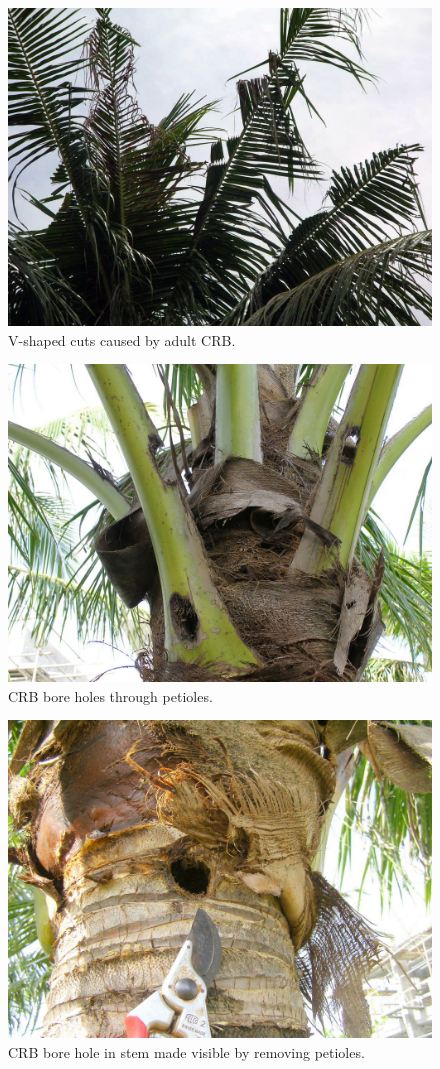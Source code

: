 \documentclass[twocolumn,letterpaper]{scrartcl}
\begin{document}
\begin{figure}[h]
	\centering
	\includegraphics[width=0.7\linewidth]{images/vshaped-cuts}
	\caption{V-shaped cuts caused by adult CRB.}
	\label{fig:vshaped-cuts}
\end{figure}

\begin{figure}[h]
	\centering
	\includegraphics[width=0.7\linewidth]{images/bore-hole-through-petiole}
	\caption{CRB bore holes through petioles.}
	\label{fig:bore-hole-through-petiole}
\end{figure}

\begin{figure}[h]
	\centering
	\includegraphics[width=0.7\linewidth]{images/bore-hole}
	\caption{CRB bore hole in stem made visible by removing petioles.}
	\label{fig:bore-hole}
\end{figure}
\end{document}
